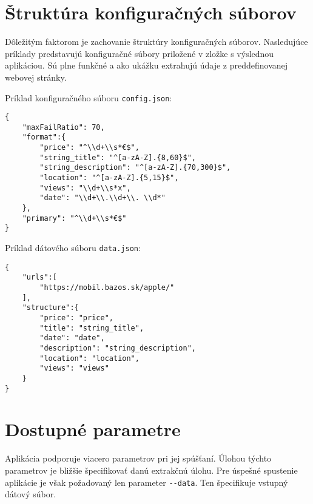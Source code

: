 \section{Štruktúra konfiguračných súborov}

Dôležitým faktorom je zachovanie štruktúry konfiguračných súborov. Nasledujúce príklady predstavujú konfiguračné súbory priložené v zložke s výslednou aplikáciou. Sú plne funkčné a ako ukážku extrahujú údaje z preddefinovanej webovej stránky.

Príklad konfiguračného súboru \texttt{config.json}:
\bigskip
\begin{lstlisting}
{
    "maxFailRatio": 70,
    "format":{
        "price": "^\\d+\\s*€$",
        "string_title": "^[a-zA-Z].{8,60}$",
        "string_description": "^[a-zA-Z].{70,300}$",
        "location": "^[a-zA-Z].{5,15}$",
        "views": "\\d+\\s*x",
        "date": "\\d+\\.\\d+\\. \\d*"
    },
    "primary": "^\\d+\\s*€$"
}
\end{lstlisting}

\newpage

Príklad dátového súboru \texttt{data.json}:
\bigskip

\begin{lstlisting}
{
    "urls":[
        "https://mobil.bazos.sk/apple/"
    ],
    "structure":{
        "price": "price",
        "title": "string_title",
        "date": "date",
        "description": "string_description",
        "location": "location",
        "views": "views"
    }
}
\end{lstlisting}

\bigskip

\section{Dostupné parametre}

Aplikácia podporuje viacero parametrov pri jej spúšťaní. Úlohou týchto parametrov je bližšie špecifikovať danú extrakčnú úlohu. Pre úspešné spustenie aplikácie je však požadovaný len parameter \texttt{-{}-data}. Ten špecifikuje vstupný dátový súbor. 

